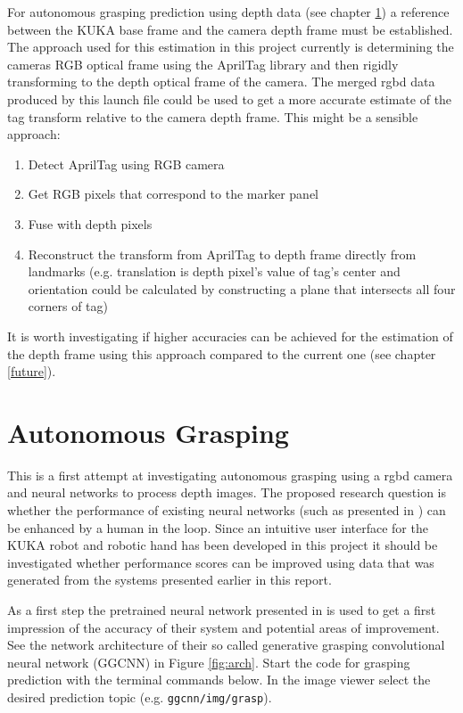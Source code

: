 \documentclass[headsepline,footinclude=false,fontsize=11pt,paper=a4,listof=totoc,bibliography=totoc,BCOR=12mm,DIV=14]{scrbook}
\begin{document}
For autonomous grasping prediction using depth data (see chapter \ref{grasping}) a reference between the KUKA base frame and the camera depth frame must be established. The approach used for this estimation in this project currently is determining the cameras RGB optical frame using the AprilTag library and then rigidly transforming to the depth optical frame of the camera. The merged \gls{rgbd} data produced by this launch file could be used to get a more accurate estimate of the tag transform relative to the camera depth frame. This might be a sensible approach:

\begin{enumerate}
	\item Detect AprilTag using RGB camera  
	\item Get RGB pixels that correspond to the marker panel
	\item Fuse with depth pixels
	\item Reconstruct the transform from AprilTag to depth frame directly from landmarks (e.g. translation is depth pixel's value of tag's center and orientation could be calculated by constructing a plane that intersects all four corners of tag)
\end{enumerate} 

It is worth investigating if higher accuracies can be achieved for the estimation of the depth frame using this approach compared to the current one (see chapter \ref{future}). 

\chapter{Autonomous Grasping}\label{grasping}

This is a first attempt at investigating autonomous grasping using a \gls{rgbd} camera and neural networks to process depth images. The proposed research question is whether the performance of existing neural networks (such as presented in \cite{Grasping}) can be enhanced by a human in the loop. Since an intuitive user interface for the KUKA robot and robotic hand has been developed in this project it should be investigated whether performance scores can be improved using data that was generated from the systems presented earlier in this report. 

As a first step the pretrained neural network presented in \cite{Grasping} is used to get a first impression of the accuracy of their system and potential areas of improvement. See the network architecture of their so called generative grasping convolutional neural network (GGCNN) in Figure \ref{fig:arch}. Start the code for grasping prediction with the terminal commands below. In the image viewer select the desired prediction topic (e.g. \texttt{ggcnn/img/grasp}).
\end{document}
